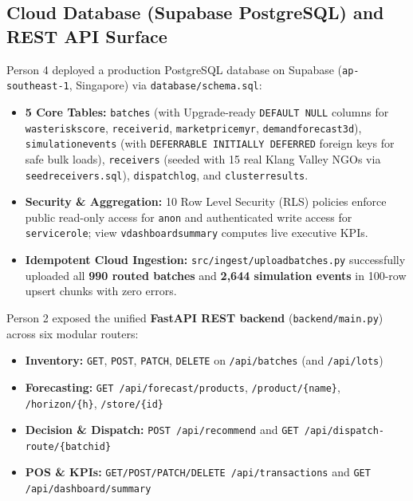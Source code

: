\documentclass[11pt,a4paper]{article}
\renewcommand{\_}{\oldunderscore\allowbreak}
\begin{document}
\subsection{Cloud Database (Supabase PostgreSQL) and REST API Surface}
Person 4 deployed a production PostgreSQL database on Supabase (\texttt{ap-southeast-1}, Singapore) via \texttt{database/schema.sql}:
\begin{itemize}[leftmargin=18pt, itemsep=2pt]
    \item \textbf{5 Core Tables:} \texttt{batches} (with Upgrade-ready \texttt{DEFAULT NULL} columns for \texttt{waste\_risk\_score}, \texttt{receiver\_id}, \texttt{market\_price\_myr}, \texttt{demand\_forecast\_3d}), \texttt{simulation\_events} (with \texttt{DEFERRABLE INITIALLY DEFERRED} foreign keys for safe bulk loads), \texttt{receivers} (seeded with 15 real Klang Valley NGOs via \texttt{seed\_receivers.sql}), \texttt{dispatch\_log}, and \texttt{cluster\_results}.
    \item \textbf{Security \& Aggregation:} 10 Row Level Security (RLS) policies enforce public read-only access for \texttt{anon} and authenticated write access for \texttt{service\_role}; view \texttt{v\_dashboard\_summary} computes live executive KPIs.
    \item \textbf{Idempotent Cloud Ingestion:} \texttt{src/ingest/upload\_batches.py} successfully uploaded all \textbf{990 routed batches} and \textbf{2,644 simulation events} in 100-row upsert chunks with zero errors.
\end{itemize}

Person 2 exposed the unified \textbf{FastAPI REST backend} (\texttt{backend/main.py}) across six modular routers:
\begin{itemize}[leftmargin=18pt, itemsep=1pt]
    \item \textbf{Inventory:} \texttt{GET}, \texttt{POST}, \texttt{PATCH}, \texttt{DELETE} on \texttt{/api/batches} (and \texttt{/api/lots})
    \item \textbf{Forecasting:} \texttt{GET /api/forecast/products}, \texttt{/product/\{name\}}, \texttt{/horizon/\{h\}}, \texttt{/store/\{id\}}
    \item \textbf{Decision \& Dispatch:} \texttt{POST /api/recommend} and \texttt{GET /api/dispatch-route/\{batch\_id\}}
    \item \textbf{POS \& KPIs:} \texttt{GET/POST/PATCH/DELETE /api/transactions} and \texttt{GET /api/dashboard/summary}
\end{itemize}
\end{document}
